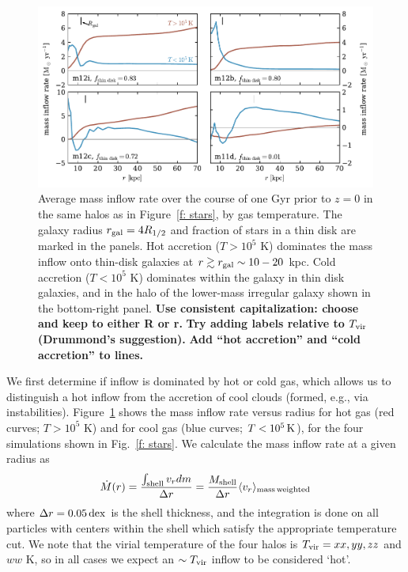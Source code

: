 \documentclass[fleqn,usenatbib]{mnras}
\newcommand{\Mdot}{\dot{M}}
\newcommand{\Tvir}{T_{\rm vir}}
\begin{document}
\begin{figure}
    \centering
    \includegraphics{figures/Mdot.pdf}
    \caption{
    Average mass inflow rate over the course of one Gyr prior to $z=0$ in the same halos as in Figure~\ref{f: stars}, by gas temperature.
    The galaxy radius $r_{\rm gal}=4 R_{1/2}$ and fraction of stars in a thin disk are marked in the panels. 
    Hot accretion ($T>10^5$ K) dominates the mass inflow onto thin-disk galaxies at $r \gtrsim r_{\rm gal} \sim 10-20$ kpc.
    Cold accretion ($T<10^5$ K) dominates within the galaxy in thin disk galaxies, and in the halo of the lower-mass irregular galaxy shown in the bottom-right panel.
    \textbf{Use consistent capitalization: choose and keep to either R or r.}
    \textbf{Try adding labels relative to $T_{\rm vir}$ (Drummond's suggestion).}
    \textbf{Add ``hot accretion'' and ``cold accretion'' to lines.}
    }
    \label{f: Mdot}
\end{figure}

We first determine if inflow is dominated by hot or cold gas, which allows us to distinguish a hot inflow from the accretion of cool clouds (formed, e.g., via instabilities).
Figure~\ref{f: Mdot} shows the mass inflow rate versus radius for hot gas (red curves; $T>10^5$ K) and for cool gas (blue curves; $T < 10^5\,{\rm K}$),  for the four simulations shown in Fig.~\ref{f: stars}. 
We calculate the mass inflow rate at a given radius as
\begin{equation}
     \Mdot(r) = \frac{\int_{\rm shell} v_r dm}{\Delta r} = \frac{M_{\rm shell}}{\Delta r} \langle v_r\rangle_{\rm mass\, weighted}
     \label{e: Mdot}
\end{equation}
where $\Delta r=0.05\,{\rm dex}$ is the shell thickness, and the integration is done on all particles with centers within the shell which satisfy the appropriate temperature cut. 
We note that the virial temperature of the four halos is $\Tvir = xx, yy, zz$ and $ww$ K, so in all cases we expect an $\sim\Tvir$ inflow  to be considered `hot'. 
\end{document}
